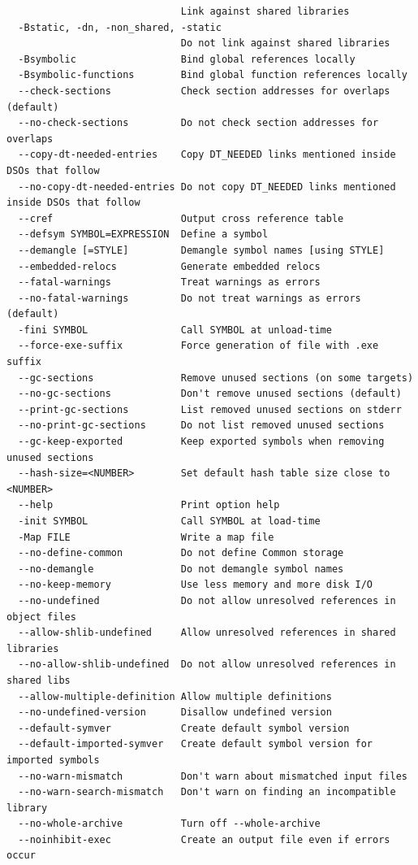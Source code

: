 \documentclass{article}
\begin{document}
\begin{lstlisting}
                              Link against shared libraries
  -Bstatic, -dn, -non_shared, -static
                              Do not link against shared libraries
  -Bsymbolic                  Bind global references locally
  -Bsymbolic-functions        Bind global function references locally
  --check-sections            Check section addresses for overlaps (default)
  --no-check-sections         Do not check section addresses for overlaps
  --copy-dt-needed-entries    Copy DT_NEEDED links mentioned inside DSOs that follow
  --no-copy-dt-needed-entries Do not copy DT_NEEDED links mentioned inside DSOs that follow
  --cref                      Output cross reference table
  --defsym SYMBOL=EXPRESSION  Define a symbol
  --demangle [=STYLE]         Demangle symbol names [using STYLE]
  --embedded-relocs           Generate embedded relocs
  --fatal-warnings            Treat warnings as errors
  --no-fatal-warnings         Do not treat warnings as errors (default)
  -fini SYMBOL                Call SYMBOL at unload-time
  --force-exe-suffix          Force generation of file with .exe suffix
  --gc-sections               Remove unused sections (on some targets)
  --no-gc-sections            Don't remove unused sections (default)
  --print-gc-sections         List removed unused sections on stderr
  --no-print-gc-sections      Do not list removed unused sections
  --gc-keep-exported          Keep exported symbols when removing unused sections
  --hash-size=<NUMBER>        Set default hash table size close to <NUMBER>
  --help                      Print option help
  -init SYMBOL                Call SYMBOL at load-time
  -Map FILE                   Write a map file
  --no-define-common          Do not define Common storage
  --no-demangle               Do not demangle symbol names
  --no-keep-memory            Use less memory and more disk I/O
  --no-undefined              Do not allow unresolved references in object files
  --allow-shlib-undefined     Allow unresolved references in shared libraries
  --no-allow-shlib-undefined  Do not allow unresolved references in shared libs
  --allow-multiple-definition Allow multiple definitions
  --no-undefined-version      Disallow undefined version
  --default-symver            Create default symbol version
  --default-imported-symver   Create default symbol version for imported symbols
  --no-warn-mismatch          Don't warn about mismatched input files
  --no-warn-search-mismatch   Don't warn on finding an incompatible library
  --no-whole-archive          Turn off --whole-archive
  --noinhibit-exec            Create an output file even if errors occur

\end{lstlisting}
\end{document}
